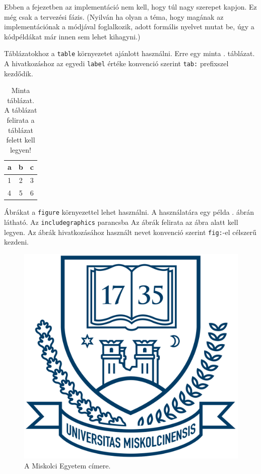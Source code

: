Ebben a fejezetben az implementáció nem kell, hogy túl nagy szerepet kapjon.
Ez még csak a tervezési fázis.
(Nyilván ha olyan a téma, hogy magának az implementációnak a módjával foglalkozik, adott formális nyelvet mutat be, úgy a kódpéldákat már innen sem lehet kihagyni.)


Táblázatokhoz a \texttt{table} környezetet ajánlott használni.
Erre egy minta . táblázat.
A hivatkozáshoz az egyedi \texttt{label} értéke konvenció szerint \texttt{tab:} prefixszel kezdődik.

\begin{table}[h]
\centering
\caption{Minta táblázat. A táblázat felirata a táblázat felett kell legyen!}
\label{tab:minta}
\begin{tabular}{l|c|c|}
a & b & c \\
\hline
1 & 2 & 3 \\
4 & 5 & 6 \\
\hline
\end{tabular}
\end{table}


Ábrákat a \texttt{figure} környezettel lehet használni.
A használatára egy példa . ábrán látható.
Az \texttt{includegraphics} parancsba 
Az ábrák felirata az ábra alatt kell legyen.
Az ábrák hivatkozásához használt nevet konvenció szerint \texttt{fig:}-el célszerű kezdeni.

\begin{figure}[h]
\centering
\includegraphics[scale=0.3]{images/me_logo.png}
\caption{A Miskolci Egyetem címere.}
\label{fig:cimer}
\end{figure}

